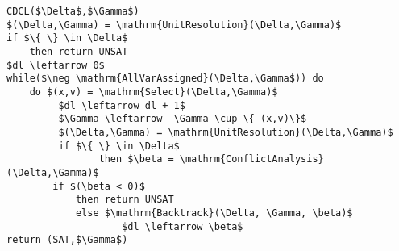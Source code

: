 \begin{lstlisting}[caption = Example CDCL Algorithm, mathescape]
CDCL($\Delta$,$\Gamma$)
$(\Delta,\Gamma) = \mathrm{UnitResolution}(\Delta,\Gamma)$
if $\{ \} \in \Delta$
	then return UNSAT
$dl \leftarrow 0$
while($\neg \mathrm{AllVarAssigned}(\Delta,\Gamma$)) do
	do $(x,v) = \mathrm{Select}(\Delta,\Gamma)$
 	     $dl \leftarrow dl + 1$
 	     $\Gamma \leftarrow  \Gamma \cup \{ (x,v)\}$
	     $(\Delta,\Gamma) = \mathrm{UnitResolution}(\Delta,\Gamma)$
	     if $\{ \} \in \Delta$
              	then $\beta = \mathrm{ConflictAnalysis}(\Delta,\Gamma)$
		if $(\beta < 0)$
			then return UNSAT
			else $\mathrm{Backtrack}(\Delta, \Gamma, \beta)$
			        $dl \leftarrow \beta$
return (SAT,$\Gamma$)
\end{lstlisting}


\begin{comment}

Resolution Proof System


\begin{mydef}[Resolution Proof System] The derivable resolution sequents $\Gamma \modres{n} C$ with a derivation of size $n$ are conveniently defined by two rules: Subsumption (or axiom) and resolution.
%
\bigskip

\label{def:resolutionps}
\begin{center}
\AxiomC{\phantom{$\Delta \modres{n} C \vee l$}}
\RightLabel{($\Sub$)  $C \subseteq C'$ }
\UnaryInfC{$\Delta,C \modres{0} C'$}
\DisplayProof
%
\qquad
%
\AxiomC{$\Delta \modres{n} C \vee l$}
\AxiomC{$ \Delta \modres{m} C' \vee \bar{l}$}
\RightLabel{($\Res$)}
\BinaryInfC{$\Delta \modres{n + m + 1} C \vee C'$}
\DisplayProof 
\end{center}
\bigskip
\end{mydef}

\end{comment}

\begin{comment}
\section{Translation to CNF}
In order to apply most modern SAT solvers typically one has to first encode the SAT problem as a CNF formula. There are a number of translations available, some naive approaches can exponentially increase the size of the resulting formula. In the following we look at the most commonly used encoding called the Tseitin Expansion \cite{GT83}.


\section{The Future: Satisfiability Modulo Theory}
More recently a new type of solver has emerged that can deal with first order formulae, these solvers are based on SAT algorithms and include extra theory modules for reasoning about arithmetic,arrays, quantifiers and equality, hence the name \emph{satisfiability modulo theory}.
\end{comment}
